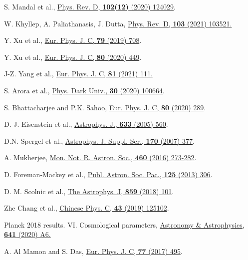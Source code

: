 \begin{thebibliography}{90}
 S. Mandal et al., \href{https://doi.org/10.1103/PhysRevD.102.124029}{Phys. Rev. D, \textbf{102(12)} (2020) 124029}.

 W. Khyllep, A. Paliathanasis, J. Dutta, \href{https://doi.org/10.1103/PhysRevD.103.103521}{Phys. Rev. D, \textbf{103} (2021) 103521.}

 Y. Xu et al.,  \href{https://doi.org/10.1140/epjc/s10052-019-7207-4}{Eur. Phys. J. C,  \textbf{79}  (2019) 708}.

 Y. Xu et al., \href{https://doi.org/10.1140/epjc/s10052-020-8023-6}{Eur. Phys. J. C, \textbf{80} (2020) 449}.

 J-Z. Yang et al., \href{https://doi.org/10.1140/epjc/s10052-021-08910-6}{Eur. Phys. J. C, \textbf{81} (2021) 111.}

 S. Arora et al., \href{https://doi.org/10.1016/j.dark.2020.100664}{Phys. Dark Univ., \textbf{30} (2020) 100664}.

 S. Bhattacharjee and P.K. Sahoo, \href{https://doi.org/10.1140/epjc/s10052-020-7844-7}{Eur. Phys. J. C,  \textbf{80} (2020) 289}.

 D. J. Eisenstein et al., \href{https://doi.org/10.1086/466512}{Astrophys. J., \textbf{633} (2005) 560}.

 D.N. Spergel  et  al., \href{https://doi.org/10.1086/513700}{Astrophys. J. Suppl. Ser., \textbf{170} (2007) 377}.


 A. Mukherjee, \href{https://doi.org/10.1093/mnras/stw964}{Mon. Not. R. Astron. Soc., \textbf{460} (2016) 273-282}.

 D. Foreman-Mackey et al., \href{https://ui.adsabs.harvard.edu/abs/2013PASP..125..306F}{Publ. Astron. Soc. Pac., \textbf{125} (2013) 306}. 

 D. M. Scolnic et al., \href{https://doi.org/10.3847/1538-4357/aab9bb}{The Astrophys. J, \textbf{859} (2018) 101}. 

 Zhe Chang et al., \href{https://doi.org/10.1088/1674-1137/43/12/125102}{Chinese Phys. C, \textbf{43} (2019) 125102}.

 Planck 2018 results. VI. Cosmological parameters, 	\href{https://doi.org/10.1051/0004-6361/201833910}{Astronomy \& Astrophysics, \textbf{641} (2020) A6. }

 A. Al Mamon and S. Das, \href{https://doi.org/10.1140/epjc/s10052-017-5066-4}{Eur. Phys. J. C, \textbf{77} (2017) 495}.


\end{thebibliography}

